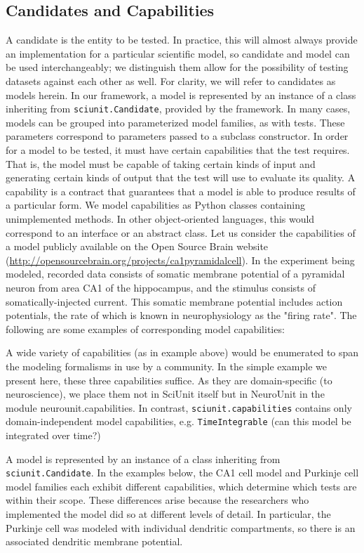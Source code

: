 \documentclass[11pt,letterpaper]{article}
\begin{document}
\subsection{Candidates and Capabilities}
A candidate is the entity to be tested.  In practice, this will almost always provide an implementation for a particular scientific model, so candidate and model can be used interchangeably; we distinguish them allow for the possibility of testing datasets against each other as well.  For clarity, we will refer to candidates as models herein.  In our framework, a model is represented by an instance of a class inheriting from \verb|sciunit.Candidate|, provided by the framework.  In many cases, models can be grouped into parameterized model families, as with tests. These parameters correspond to parameters passed to a subclass constructor.
In order for a model to be tested, it must have certain capabilities that the test requires.  That is, the model must be capable of taking certain kinds of input and generating certain kinds of output that the test will use to evaluate its quality.  A capability is a contract that guarantees that a model is able to produce results of a particular form. We model capabilities as Python classes containing unimplemented methods. In other object-oriented languages, this would correspond to an interface or an abstract class.  
Let us consider the capabilities of a model publicly available on the Open Source Brain website (\url{http://opensourcebrain.org/projects/ca1pyramidalcell}).  In the experiment being modeled, recorded data consists of somatic membrane potential of a pyramidal neuron from area CA1 of the hippocampus, and the stimulus consists of somatically-injected current.  This somatic membrane potential includes action potentials, the rate of which is known in neurophysiology as the "firing rate".  The following are some examples of corresponding model capabilities:  

A wide variety of capabilities (as in example above) would be enumerated to span the modeling formalisms in use by a community. In the simple example we present here, these three capabilities suffice.  As they are domain-specific (to neuroscience), we place them not in SciUnit itself but in NeuroUnit in the module neurounit.capabilities.  In contrast, \verb|sciunit.capabilities| contains only domain-independent model capabilities, e.g. \verb|TimeIntegrable| (can this model be integrated over time?)

A model is represented by an instance of a class inheriting from \verb|sciunit.Candidate|.  In the examples below, the CA1 cell model and Purkinje cell model families each exhibit different capabilities, which determine which tests are within their scope.  These differences arise because the researchers who implemented the model did so at different levels of detail.  In particular, the Purkinje cell was modeled with individual dendritic compartments, so there is an associated dendritic membrane potential. 
\end{document}
